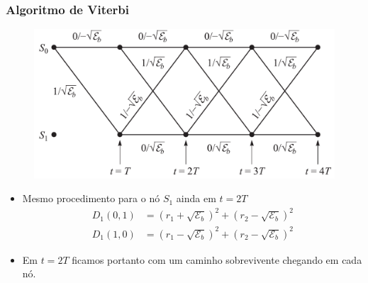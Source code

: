 \begin{frame}
	\frametitle{Algoritmo de Viterbi}

	\vspace{-0.3cm}
	\begin{figure}[t]	
	  \begin{center}
	    \includegraphics[width=0.5\columnwidth]{figs/pam_38}
	  \end{center}\vspace{-0.5cm}
	\end{figure}
	\begin{itemize}
	    \item Mesmo procedimento para o nó $S_1$ ainda em $t=2T$
	    \begin{align*}
		D_1(0,1) &= (r_1 + \sqrt{\mathcal{E}_b})^2 + (r_2 - \sqrt{\mathcal{E}_b})^2 \\
		D_1(1,0) &= (r_1 - \sqrt{\mathcal{E}_b})^2 + (r_2 - \sqrt{\mathcal{E}_b})^2
	    \end{align*}
	    \item Em $t=2T$ ficamos portanto com um caminho sobrevivente chegando em cada nó.
	\end{itemize}
\end{frame}

